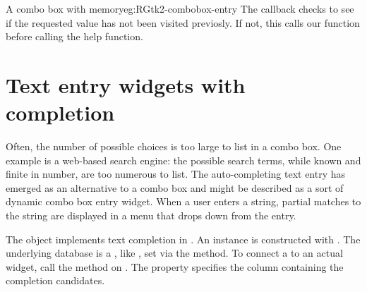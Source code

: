 \begin{example}{A combo box with memory}{eg:RGtk2-combobox-entry}
The  callback checks to see if the requested value has
not been visited previosly. If not, this calls our 
function before calling the help function.
\begin{Schunk}
\end{Schunk}


\end{example}




\section{Text entry widgets with completion}
\label{sec:RGtk2:entry-completion}

Often, the number of possible choices is too large to list in a combo
box. One example is a web-based search engine: the possible search
terms, while known and finite in number, are too numerous to list. The
auto-completing text entry has emerged as an alternative to a combo
box and might be described as a sort of dynamic combo box entry widget. 
When a user enters a string, partial matches to the string are
displayed in a menu that drops down from the entry. 

The  object implements text completion in
\GTK. An instance is constructed with
. The underlying database is a
, like , set via the
 method. To connect a
 to an actual  widget, call
the  method on .  The
 property specifies the column containing the
completion candidates. 

